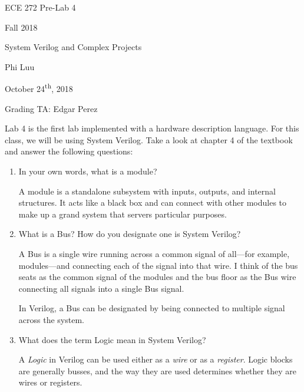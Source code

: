 \documentclass[12pt]{article}
\begin{document}
\begin{titlepage}
  \begin{center} \LARGE
    \vspace*{1.5in}

    ECE 272 Pre-Lab 4

    Fall 2018

    \vfill

    System Verilog and Complex Projects

    Phi Luu

    \vfill

    October 24\textsuperscript{th}, 2018

    Grading TA: Edgar Perez

    \vspace{1.5in}
  \end{center}
\end{titlepage}

Lab 4 is the first lab implemented with a hardware description language. For this class, we will be using System Verilog. Take a look at chapter 4 of the textbook and answer the following questions:

\begin{enumerate}
  \item In your own words, what is a module?

  A module is a standalone subsystem with inputs, outputs, and internal structures. It acts like a black box and can connect with other modules to make up a grand system that servers particular purposes.

  \item What is a Bus? How do you designate one is System Verilog?

  A Bus is a single wire running across a common signal of all---for example, modules---and connecting each of the signal into that wire. I think of the bus seats as the common signal of the modules and the bus floor as the Bus wire connecting all signals into a single Bus signal.

  In Verilog, a Bus can be designated by being connected to multiple signal across the system.

  \item What does the term Logic mean in System Verilog?

  A \textit{Logic} in Verilog can be used either as a \textit{wire} or as a \textit{register}. Logic blocks are generally busses, and the way they are used determines whether they are wires or registers.
\end{enumerate}
\end{document}
